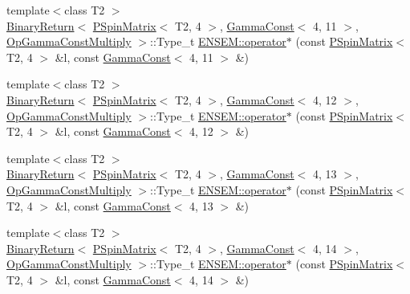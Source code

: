 \begin{DoxyCompactItemize}
\item 
{\footnotesize template$<$class T2 $>$ }\\\mbox{\hyperlink{structENSEM_1_1BinaryReturn}{Binary\+Return}}$<$ \mbox{\hyperlink{classENSEM_1_1PSpinMatrix}{P\+Spin\+Matrix}}$<$ T2, 4 $>$, \mbox{\hyperlink{classENSEM_1_1GammaConst}{Gamma\+Const}}$<$ 4, 11 $>$, \mbox{\hyperlink{structENSEM_1_1OpGammaConstMultiply}{Op\+Gamma\+Const\+Multiply}} $>$\+::Type\+\_\+t \mbox{\hyperlink{group__primspinmatrix_gaaf604778bbb015bcd9e40d133993fda3}{E\+N\+S\+E\+M\+::operator$\ast$}} (const \mbox{\hyperlink{classENSEM_1_1PSpinMatrix}{P\+Spin\+Matrix}}$<$ T2, 4 $>$ \&l, const \mbox{\hyperlink{classENSEM_1_1GammaConst}{Gamma\+Const}}$<$ 4, 11 $>$ \&)
\item 
{\footnotesize template$<$class T2 $>$ }\\\mbox{\hyperlink{structENSEM_1_1BinaryReturn}{Binary\+Return}}$<$ \mbox{\hyperlink{classENSEM_1_1PSpinMatrix}{P\+Spin\+Matrix}}$<$ T2, 4 $>$, \mbox{\hyperlink{classENSEM_1_1GammaConst}{Gamma\+Const}}$<$ 4, 12 $>$, \mbox{\hyperlink{structENSEM_1_1OpGammaConstMultiply}{Op\+Gamma\+Const\+Multiply}} $>$\+::Type\+\_\+t \mbox{\hyperlink{group__primspinmatrix_ga8c42140341467357377e412313e01a3c}{E\+N\+S\+E\+M\+::operator$\ast$}} (const \mbox{\hyperlink{classENSEM_1_1PSpinMatrix}{P\+Spin\+Matrix}}$<$ T2, 4 $>$ \&l, const \mbox{\hyperlink{classENSEM_1_1GammaConst}{Gamma\+Const}}$<$ 4, 12 $>$ \&)
\item 
{\footnotesize template$<$class T2 $>$ }\\\mbox{\hyperlink{structENSEM_1_1BinaryReturn}{Binary\+Return}}$<$ \mbox{\hyperlink{classENSEM_1_1PSpinMatrix}{P\+Spin\+Matrix}}$<$ T2, 4 $>$, \mbox{\hyperlink{classENSEM_1_1GammaConst}{Gamma\+Const}}$<$ 4, 13 $>$, \mbox{\hyperlink{structENSEM_1_1OpGammaConstMultiply}{Op\+Gamma\+Const\+Multiply}} $>$\+::Type\+\_\+t \mbox{\hyperlink{group__primspinmatrix_ga144197a9be57f3b174a39c02a6c5e03f}{E\+N\+S\+E\+M\+::operator$\ast$}} (const \mbox{\hyperlink{classENSEM_1_1PSpinMatrix}{P\+Spin\+Matrix}}$<$ T2, 4 $>$ \&l, const \mbox{\hyperlink{classENSEM_1_1GammaConst}{Gamma\+Const}}$<$ 4, 13 $>$ \&)
\item 
{\footnotesize template$<$class T2 $>$ }\\\mbox{\hyperlink{structENSEM_1_1BinaryReturn}{Binary\+Return}}$<$ \mbox{\hyperlink{classENSEM_1_1PSpinMatrix}{P\+Spin\+Matrix}}$<$ T2, 4 $>$, \mbox{\hyperlink{classENSEM_1_1GammaConst}{Gamma\+Const}}$<$ 4, 14 $>$, \mbox{\hyperlink{structENSEM_1_1OpGammaConstMultiply}{Op\+Gamma\+Const\+Multiply}} $>$\+::Type\+\_\+t \mbox{\hyperlink{group__primspinmatrix_ga45919c652c2dae5905f239b2f35eb67c}{E\+N\+S\+E\+M\+::operator$\ast$}} (const \mbox{\hyperlink{classENSEM_1_1PSpinMatrix}{P\+Spin\+Matrix}}$<$ T2, 4 $>$ \&l, const \mbox{\hyperlink{classENSEM_1_1GammaConst}{Gamma\+Const}}$<$ 4, 14 $>$ \&)

\end{DoxyCompactItemize}
